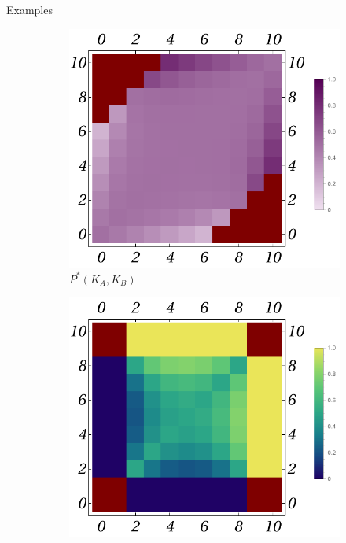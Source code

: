 \documentclass{beamer}
\theoremstyle{definition}
\begin{document}
\begin{frame}[shrink=15]{Examples}
    \begin{figure}[H]
    \centering
    \begin{subfigure}[b]{0.3\textwidth}
        \includegraphics[width=\textwidth]{img/PB_Plot_4_10.pdf}
        \caption{\small \centering $P^*(K_A,K_B)$}
        \label{fig:BGame4_10_P}
    \end{subfigure}
    \hfill %
    \begin{subfigure}[b]{0.3\textwidth}
        \includegraphics[width=\textwidth]{img/ppkB_Plot_4_10.pdf}

\end{subfigure}
\end{figure}
\end{frame}
\end{document}
